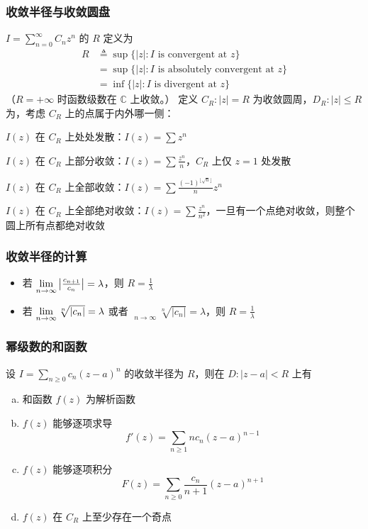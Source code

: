 \documentclass[./main.tex]{subfiles}
\begin{document}
\subsubsection{收敛半径与收敛圆盘}
$I=\sum_{n=0}^{\infty}C_nz^n$ 的 $R$ 定义为
\begin{align*}
R&\triangleq\sup\{|z|:I\text{ is convergent at }z\}\\
&=\sup\{|z|:I\text{ is absolutely convergent at }z\}\\
&=\inf\{|z|:I\text{ is divergent at } z\}
\end{align*}
（$R=+\infty$ 时函数级数在 $\mathbb{C}$ 上收敛。）
定义 $C_R:|z|=R$ 为收敛圆周，$D_R:|z|\le R$ 为，考虑 $C_R$ 上的点属于内外哪一侧：
\begin{itemize*}
\item $I(z)$ 在 $C_R$ 上处处发散：$I(z)=\sum z^n$
\item $I(z)$ 在 $C_R$ 上部分收敛：$I(z)=\sum\frac{z^n}{n}$，$C_R$ 上仅 $z=1$ 处发散
\item $I(z)$ 在 $C_R$ 上全部收敛：$I(z)=\sum\frac{(-1)^{\lfloor\sqrt{n}\rfloor}}{n}z^n$
\item $I(z)$ 在 $C_R$ 上全部绝对收敛：$I(z)=\sum \frac{z^n}{n^2}$，一旦有一个点绝对收敛，则整个圆上所有点都绝对收敛
\end{itemize*}
\subsubsection{收敛半径的计算}
\begin{itemize}
\item 若 $\lim\limits_{n\rightarrow\infty}\big|\frac{c_{n+1}}{c_n}\big|=\lambda$，则 $R=\frac{1}{\lambda}$
\item 若 $\lim\limits_{n\rightarrow\infty}\sqrt[n]{|c_n|}=\lambda$ 或者 $\mathop{\overline{\lim}}\limits_{n\rightarrow\infty}\sqrt[n]{|c_n|}=\lambda$，则 $R=\frac{1}{\lambda}$
\end{itemize}
\subsubsection{幂级数的和函数}
设 $I=\sum_{n\ge 0}c_n(z-a)^n$ 的收敛半径为 $R$，则在 $D:|z-a|<R$ 上有
\begin{enumerate}[(a)]
    \item 和函数 $f(z)$ 为解析函数
    \item $f(z)$ 能够逐项求导
    $$f'(z)=\sum_{n\ge 1}nc_n(z-a)^{n-1}$$
    \item $f(z)$ 能够逐项积分
    $$F(z)=\sum_{n\ge 0}\frac{c_n}{n+1}(z-a)^{n+1}$$
    \item $f(z)$ 在 $C_R$ 上至少存在一个奇点
\end{enumerate}
\end{document}
